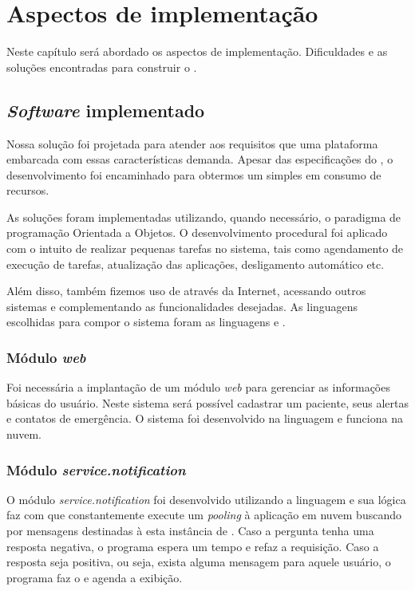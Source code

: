 \chapter{Aspectos de implementação}\label{cap:aspectos-de-implementacao}

Neste capítulo será abordado os aspectos de implementação. Dificuldades e as
soluções encontradas para construir o \software.

\section{\textit{Software} implementado}\label{sec:software-implementado}

Nossa solução foi projetada para atender aos requisitos que uma plataforma
embarcada com essas características demanda. Apesar das especificações do
\hardware[], o desenvolvimento foi encaminhado para obtermos um \software[]
simples em consumo de recursos.

As soluções foram implementadas utilizando, quando necessário, o paradigma
de programação Orientada a Objetos. O desenvolvimento procedural foi aplicado
com o intuito de realizar pequenas tarefas no sistema, tais como agendamento
de execução de tarefas, atualização das aplicações, desligamento automático etc.

Além disso, também fizemos uso de \webservices[] através da Internet, acessando
outros sistemas e complementando as funcionalidades desejadas. As linguagens
escolhidas para compor o sistema foram as linguagens \python[] e \shell.

\subsection{Módulo \textit{web}}

Foi necessária a implantação de um módulo \textit{web} para gerenciar as 
informações básicas do usuário. Neste sistema será possível cadastrar um 
paciente, seus alertas e contatos de emergência. O sistema foi desenvolvido
na linguagem \python[] e funciona na nuvem.

\subsection{Módulo \textit{service.notification}}\label{subsec:notification}

O módulo \textit{service.notification} foi desenvolvido utilizando a linguagem
\python[] e sua lógica faz com que constantemente execute um \textit{pooling} 
à aplicação em nuvem buscando por mensagens destinadas à esta instância de 
\software. Caso a pergunta tenha uma resposta negativa, o programa espera um 
tempo e refaz a requisição. Caso a resposta seja positiva, ou seja, exista 
alguma mensagem para aquele usuário, o programa faz o \download[] e agenda a
exibição. 

